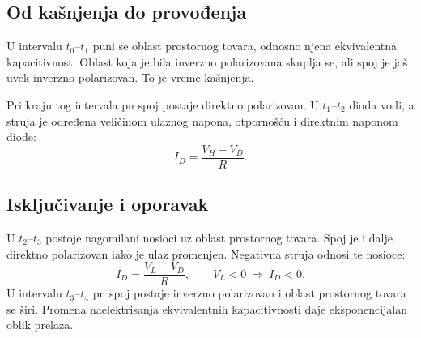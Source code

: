 \subsection*{Od kašnjenja do provođenja}
U intervalu $t_0$–$t_1$ puni se oblast prostornog tovara, odnosno njena ekvivalentna kapacitivnost. Oblast koja je bila inverzno polarizovana skuplja se, ali spoj je još uvek inverzno polarizovan. To je vreme kašnjenja.

Pri kraju tog intervala pn spoj postaje direktno polarizovan. U $t_1$–$t_2$ dioda vodi, a struja je određena veličinom ulaznog napona, otpornošću i direktnim naponom diode:
\[I_D=\frac{V_H-V_D}{R}.\]
\subsection*{Isključivanje i oporavak}
U $t_2$–$t_3$ postoje nagomilani nosioci uz oblast prostornog tovara. Spoj je i dalje direktno polarizovan iako je ulaz promenjen. Negativna struja odnosi te nosioce:
\[I_D=\frac{V_L-V_D}{R},\qquad V_L<0\ \Longrightarrow\ I_D<0.\]
U intervalu $t_3$–$t_4$ pn spoj postaje inverzno polarizovan i oblast prostornog tovara se širi. Promena naelektrisanja ekvivalentnih kapacitivnosti daje eksponencijalan oblik prelaza.

